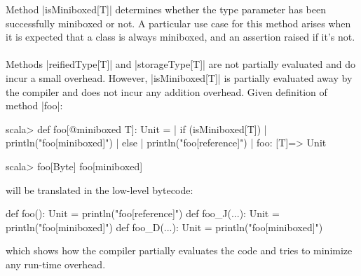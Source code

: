 Method |isMiniboxed[T]| determines whether the type parameter has been successfully miniboxed or not. A particular use case for this method arises when it is expected that a class is always miniboxed, and an assertion raised if it's not.


\paragraph{}
Methods |reifiedType[T]| and |storageType[T]| are not partially evaluated and do incur a small overhead. However, |isMiniboxed[T]| is partially evaluated away by the compiler and does not incur any addition overhead. Given definition of method |foo|:

\begin{lstlisting-nobreak}
scala> def foo[@miniboxed T]: Unit = {
    |   if (isMiniboxed[T])
    |     println("foo[miniboxed]")
    |   else
    |     println("foo[reference]")
    | }
	foo: [T]=> Unit
 
scala> foo[Byte]
	foo[miniboxed]
\end{lstlisting-nobreak}

will be translated in the low-level bytecode:

\begin{lstlisting-nobreak}
def foo(): Unit = println("foo[reference]")
def foo_J(...): Unit = println("foo[miniboxed]")
def foo_D(...): Unit = println("foo[miniboxed]")
\end{lstlisting-nobreak}

which shows how the compiler partially evaluates the code and tries to minimize any run-time overhead.